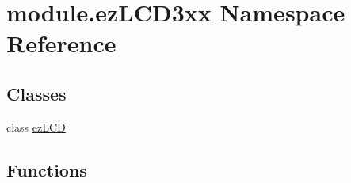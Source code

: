 \hypertarget{namespacemodule_1_1ez_l_c_d3xx}{\section{module.\-ez\-L\-C\-D3xx Namespace Reference}
\label{namespacemodule_1_1ez_l_c_d3xx}
}
\subsection*{Classes}
\begin{DoxyCompactItemize}
\item 
class \hyperlink{classmodule_1_1ez_l_c_d3xx_1_1ez_l_c_d}{ez\-L\-C\-D}
\end{DoxyCompactItemize}
\subsection*{Functions}
